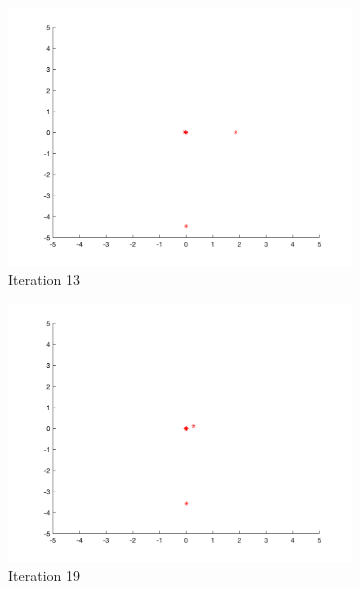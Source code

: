 \begin{figure}
\begin{subfigure}[b]{0.4\textwidth}
    \includegraphics[width=\textwidth]{img/smpl/sphr/loa-iter-13}
    \caption{Iteration 13}
    \label{fig:s2-iter-2}
  \end{subfigure}
  \begin{subfigure}[b]{0.4\textwidth}
    \includegraphics[width=\textwidth]{img/smpl/sphr/loa-iter-19}
    \caption{Iteration 19}
    \label{fig:s2-iter-3}
  \end{subfigure}
  \begin{subfigure}[b]{0.4\textwidth}

\end{subfigure}
\end{figure}
